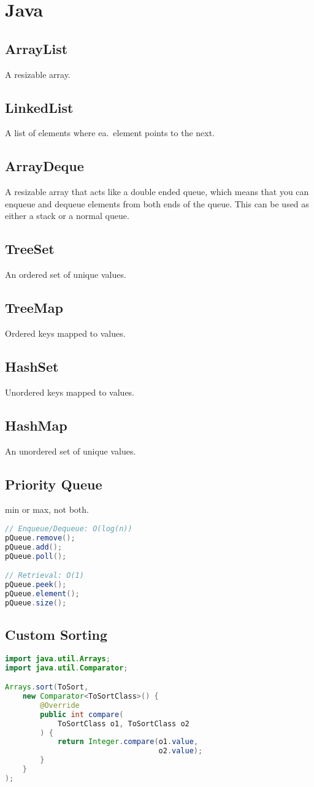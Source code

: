 \section{Java}
\subsection*{ArrayList}
A resizable array.
\subsection*{LinkedList}
A list of elements where ea.\ element points to the next.
\subsection*{ArrayDeque}
A resizable array that acts like a double ended queue, which means that you can enqueue
and dequeue elements from both ends of the queue. This can be used as either a stack or a normal queue.
\subsection*{TreeSet}
An ordered set of unique values.
\subsection*{TreeMap}
Ordered keys mapped to values.
\subsection*{HashSet}
Unordered keys mapped to values.
\subsection*{HashMap}
An unordered set of unique values.
\subsection*{Priority Queue}
min or max, not both.
\begin{lstlisting}[language=Java,basicstyle=\tiny]
// Enqueue/Dequeue: O(log(n))
pQueue.remove();
pQueue.add();
pQueue.poll();

// Retrieval: O(1)
pQueue.peek();
pQueue.element();
pQueue.size();
\end{lstlisting}
\subsection*{Custom Sorting}
\begin{lstlisting}[language=Java,basicstyle=\tiny]
import java.util.Arrays;
import java.util.Comparator;

Arrays.sort(ToSort,
    new Comparator<ToSortClass>() {
        @Override
        public int compare(
            ToSortClass o1, ToSortClass o2
        ) {
            return Integer.compare(o1.value,
                                   o2.value);
        }
    }
);
\end{lstlisting}

